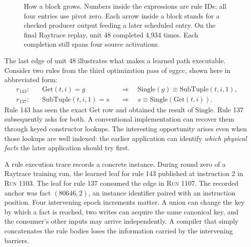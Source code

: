 \documentclass[10pt,letterpaper]{article}
\newcommand{\run}{\textsc{Run}}
\begin{document}
\begin{figure}[ht]
\centering
{}
\caption{How a block grows. Numbers inside the expressions are rule IDs; all four entries use pivot zero. Each arrow inside a block stands for a checked producer output feeding a later scheduled entry. On the final Raytrace replay, unit 48 completed 4,934 times. Each completion still spans four source activations.}
\label{fig:bake}
\end{figure}

The last edge of unit 48 illustrates what makes a learned path executable. Consider two rules from the third optimization pass of eggcc, shown here in abbreviated form:
\begin{align*}
r_{143}:\quad& \mathrm{Get}(t,i)=g
  &&\Longrightarrow\quad \mathrm{Single}(g)\equiv\mathrm{SubTuple}(t,i,1),\\
r_{137}:\quad& \mathrm{SubTuple}(t,i,1)=s
  &&\Longrightarrow\quad s\equiv\mathrm{Single}(\mathrm{Get}(t,i)).
\end{align*}
Rule 143 has seen the exact \(\mathrm{Get}\) row and obtained the result of \(\mathrm{Single}\). Rule 137 subsequently asks for both. A conventional implementation can recover them through keyed constructor lookups. The interesting opportunity arises even when those lookups are well indexed: the earlier application can identify \emph{which physical facts} the later application should try first.

A rule execution trace records a concrete instance. During round zero of a Raytrace training run, the learned leaf for rule 143 published at instruction 2 in \run{} 1103. The leaf for rule 137 consumed the edge in \run{} 1107. The recorded anchor was fact \((80646,2)\), an instance identifier paired with an instruction position. Four intervening epoch increments matter. A union can change the key by which a fact is reached, two writes can acquire the same canonical key, and the consumer's other inputs may arrive independently. A compiler that simply concatenates the rule bodies loses the information carried by the intervening barriers.
\end{document}
